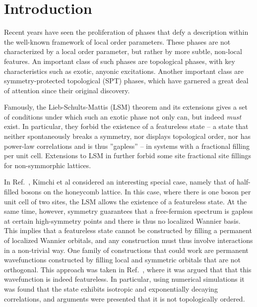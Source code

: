 
\section{Introduction}


Recent years have seen the proliferation of phases that defy a description
within the well-known framework of local order parameters. These phases are
not characterized by a local order parameter, but rather by more subtle,
non-local features. An important class of such phases are topological phases,
with key characteristics such as exotic, anyonic excitations. Another
important class are symmetry-protected topological (SPT) phases, which have
garnered a great deal of attention since their original discovery.

Famously, the Lieb-Schults-Mattis (LSM) theorem and its extensions gives a set of
conditions under which such an exotic phase not only can, but indeed \emph{must}
exist. In particular, they forbid the existence of a featureless state
-- a state that neither spontaneously breaks a symmetry, nor displays topological
order, nor has power-law correlations and is thus ''gapless'' -- in systems
with a fractional filling per unit cell. Extensions to LSM in  further
forbid some site fractional site fillings for non-symmorphic lattices.

In Ref.~, Kimchi et al considered an interesting special case, namely that of half-filled bosons on the honeycomb lattice.
In this case, where there is one boson per unit cell of two sites, the LSM allows the existence of a featureless state.
At the same time, however, symmetry guarantees that
a free-fermion spectrum is gapless at certain high-symmetry points and there is
thus no localized Wannier basis.
This implies that a featureless state cannot be constructed by filling a permanent of localized Wannier
orbitals, and any construction must thus involve interactions in a non-trivial way. One family of
constructions that could work are permanent wavefunctions constructed by filling local and symmetric
orbitals that are not orthogonal. This approach was taken in Ref.~, where
it was argued that that this wavefunction is indeed featureless.
In particular, using numerical simulations it was found that the state exhibits
isotropic and exponentially decaying correlations, and arguments were presented that it is not
topologically ordered.

